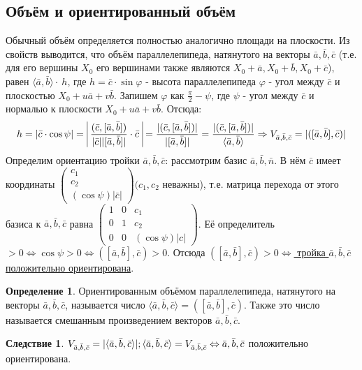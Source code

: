 \documentclass[a4paper, 12pt]{article}
\renewcommand{\phi}{\varphi}
\theoremstyle{definition}
\newtheorem*{definition}{Определение}
\newtheorem*{consequense}{Следствие}
\begin{document}
	\subsection{Объём и ориентированный объём}
	Обычный объём определяется полностью аналогично площади на плоскости.
	Из свойств выводится, что объём параллелепипеда, натянутого на векторы $\bar{a}, \bar{b}, \bar{c}$ (т.е. для его вершины $X_0$ его вершинами также являются $X_0 + \bar{a}, X_0 + \bar{b}, X_0 + \bar{c}$), равен $\langle\bar{a}, \bar{b}\rangle \cdot \ h$, где $h = \bar{c}\cdot\sin\phi$ - высота параллелепипеда $\phi$ - угол между $\bar{c}$ и плоскостью $X_0 + u\bar{a} + v\bar{b}$. Запишем $\phi$ как $\frac{\pi}{2} - \psi$, где $\psi$ - угол между $\bar{c}$ и нормалью к плоскости $X_0 + u\bar{a} + v\bar{b}$. Отсюда:
	\begin{align*}
		h = |\bar{c}\cdot\cos\psi| = \ \vline\frac{(\bar{c}, [\bar{a}, \bar{b}])}{|\bar{c}||[\bar{a}, \bar{b}]|}\cdot \bar{c}\ \vline = \frac{|(\bar{c}, [\bar{a}, \bar{b}])|}{|[\bar{a}, \bar{b}]|} = \frac{|(\bar{c}, [\bar{a}, \bar{b}])|}{\langle\bar{a}, \bar{b}\rangle} \Rightarrow V_{\bar{a}, \bar{b}, \bar{c}} = |([\bar{a}, \bar{b}], \bar{c})|
	\end{align*}
	Определим ориентацию тройки $\bar{a}, \bar{b}, \bar{c}$: рассмотрим базис $\bar{a}, \bar{b}, \bar{n}$. В нём $\bar{c}$ имеет координаты $\begin{pmatrix} c_1  \\ c_2 \\ (\cos\psi)|\bar{c}| \end{pmatrix} (c_1, c_2$ неважны), т.е. матрица перехода от этого базиса к $\bar{a}, \bar{b}, \bar{c}$ равна $\begin{pmatrix} 1&0&c_1\\0&1&c_2\\0&0&(\cos\psi)|c|\end{pmatrix}$. Её определитель $>0 \Leftrightarrow \cos\psi > 0 \Leftrightarrow ([\bar{a}, \bar{b}], \bar{c}) > 0$. Отсюда \underline{$([\bar{a}, \bar{b}], \bar{c}) > 0 \Leftrightarrow$ тройка $\bar{a}, \bar{b}, \bar{c}$ положительно ориентирована}.
	\begin{definition}
		Ориентированным объёмом параллелепипеда, натянутого на векторы $\bar{a}, \bar{b}, \bar{c}$, называется число $\langle \bar{a}, \bar{b}, \bar{c}\rangle = ([\bar{a}, \bar{b}], \bar{c})$. Также это число называется смешанным произведением векторов $\bar{a}, \bar{b}, \bar{c}$.
	\end{definition}
	\begin{consequense}
		$V_{\bar{a}, \bar{b}, \bar{c}} = |\langle\bar{a}, \bar{b}, \bar{c}\rangle|;\\\langle\bar{a}, \bar{b}, \bar{c}\rangle = V_{\bar{a}, \bar{b}, \bar{c}} \Leftrightarrow \bar{a}, \bar{b}, \bar{c}$ положительно ориентирована.   
	\end{consequense}
\end{document}
